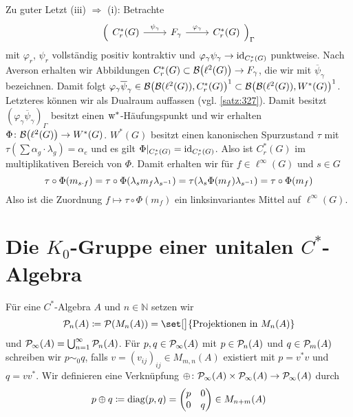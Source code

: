 \begin{beweis}[name={von \autoref{satz:53}}]
	Zu guter Letzt (iii) $\Rightarrow$ (i):
	Betrachte
	\[
		\Big(  
		\begin{tikzcd}
			C_r^*(G) \rar["\psi_\gamma"] & F_\gamma \rar["\varphi_\gamma"] & C_r^*(G)
		\end{tikzcd}
		\Big)_{\Gamma}
	\]
	mit $\varphi_r$, $\psi_r$ vollständig positiv kontraktiv und $\varphi_\gamma \psi_\gamma \to \operatorname{id}_{C^*_r(G)}$ punktweise.
	Nach Averson erhalten wir Abbildungen $C_r^*(G) \subset \mathcal{B} \enbrace*{\ell^2(G)} \to F_\gamma$, die wir mit $\overline{\psi}_\gamma$ bezeichnen.
	Damit folgt $\varphi_\gamma \overline{\psi}_\gamma \in \mathcal{B} \enbrace[\big]{ \mathcal{B}(\ell^2(G)), C_r^*(G)}^1 \subset \mathcal{B} \enbrace*{\mathcal{B}(\ell^2(G)), W^*(G)}^1$.
	Letzteres können wir als Dualraum auffassen (vgl. \autoref{satz:327}).
	Damit besitzt $(\varphi_\gamma \overline{\psi}_\gamma)_\Gamma$ besitzt einen $\mkern1mu\mathrm{w}^*$-Häufungspunkt und wir erhalten $\Phi \colon \mathcal{B} \enbrace*{\ell^2(G)} \to W^*(G)$.
	$W^*(G)$ besitzt einen kanonischen Spurzustand $\tau$ mit $\tau(\sum \alpha_g \cdot \lambda_g) = \alpha_e$ und es gilt $\Phi|_{C^*_r(G)} = \operatorname{id}_{C_r^*(G)}$.
	Also ist $C^*_r(G)$ im multiplikativen Bereich von $\Phi$.
	Damit erhalten wir für $f \in \ell^\infty(G)$ und $s \in G$ 
	\[
		\tau \circ \Phi(m_{s \cdot f}) = \tau \circ \Phi(\lambda_s m_f \lambda_{s^{-1}}) = \tau \enbrace*{\lambda_s \Phi(m_f) \lambda_{s^{-1}}} =\tau \circ \Phi(m_f)
	\]
	Also ist die Zuordnung $f \mapsto \tau \circ \Phi(m_f)$ ein linksinvariantes Mittel auf $\ell^\infty(G)$. 
\end{beweis}
\newpage


\section{Die $K_0$-Gruppe einer unitalen $C^*$-Algebra} %
\label{sec:6}

\begin{definition}[{name=[{Projektionen in Matrizen über einer $C^*$-Algebra}]}]
	Für eine $C^*$-Algebra $A$ und $n \in \mathbb{N}$ setzen wir
	\[
		\kernedP_n(A) \coloneqq \mathcal{P}(M_n(A)) = \set[\big]{\text{Projektionen in }M_n(A) }
	\]
	und $\mathcal{P}\mkern-2mu_{\infty}(A) = \bigcup_{n=1}^\infty \mathcal{P}\mkern-2mu_n(A)$.
	Für $p,q \in \mathcal{P}\mkern-2mu_{\infty}(A)$ mit $p \in \mathcal{P}\mkern-2mu_n(A)$ und $q \in \mathcal{P}\mkern-2mu_m(A)$ schreiben wir $p \sim_0 q$, falls $v = (v_{ij})_{ij} \in M_{m,n}(A)$ existiert mit $p=v^*v$ und $q = vv^*$.
	Wir definieren eine Verknüpfung $\oplus  \colon \mathcal{P}\mkern-2mu_{\infty}(A) \times \mathcal{P}\mkern-2mu_{\infty}(A) \to \mathcal{P}\mkern-2mu_{\infty}(A)$ durch
	\[
		p \oplus q \coloneqq \operatorname{diag}(p,q) = \begin{pmatrix}
			p & 0 \\
			0 & q
		\end{pmatrix} \in M_{n+m}(A)
	\]
\end{definition}

